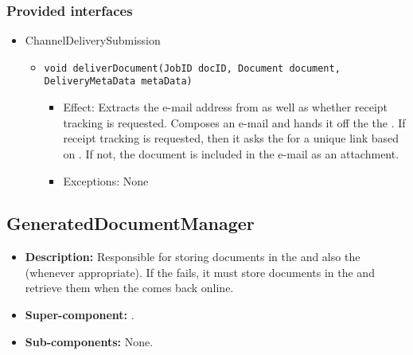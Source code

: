 \subsubsection*{Provided interfaces}
\begin{itemize}
    \item ChannelDeliverySubmission
    \begin{itemize}
        \item \texttt{void deliverDocument(JobID docID, Document document, DeliveryMetaData metaData)}
        \begin{itemize}
            \item Effect: Extracts the e-mail address from  as well as whether receipt tracking is requested. Composes an e-mail and hands it off the the . If receipt tracking is requested, then it asks the  for a unique link based on . If not, the document is included in the e-mail as an attachment.
            \item Exceptions: None
        \end{itemize}
    \end{itemize}
\end{itemize}

\subsection{GeneratedDocumentManager}
\begin{itemize}
    \item \textbf{Description:} Responsible for storing documents in the  and also the  (whenever appropriate). If the  fails, it must store documents in the  and retrieve them when the  comes back online.
    \item \textbf{Super-component:} .
    \item \textbf{Sub-components:} None.
\end{itemize}

